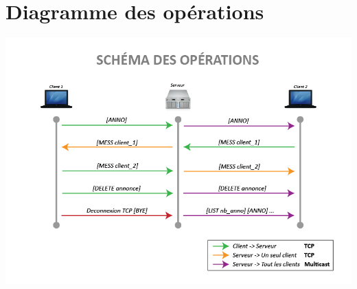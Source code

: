 \documentclass[12pt]{article}
\begin{document}
\section{Diagramme des opérations}

\includegraphics[width=\textwidth]{rendu1/Protocole_Operations.png}
\end{document}
